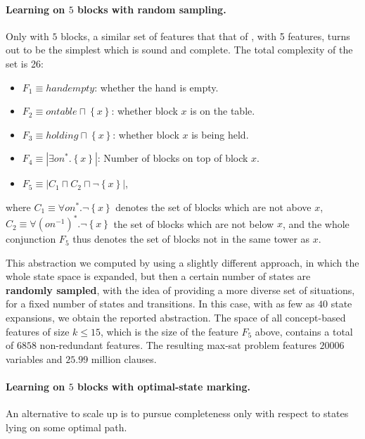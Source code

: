 \documentclass[12pt]{article}
\newcommand{\set}[1]{\ensuremath{\left\{#1 \right\}}}
\newcommand{\abs}[1]{\ensuremath{\left\vert{#1}\right\vert}}
\begin{document}
\paragraph{Learning on $5$ blocks with random sampling.}

Only with $5$ blocks, a similar set of features that that of \citep{bonet2018features}, with 5 features, turns out to be the simplest
which is sound and complete. The total complexity of the set is 26:


\begin{itemize}
 \item $F_1 \equiv handempty$: whether the hand is empty.
 \item $F_2 \equiv ontable \sqcap \set{x}$: whether block $x$ is on the table.
 \item $F_3 \equiv holding \sqcap \set{x}$: whether block $x$ is being held.
 \item $F_4 \equiv \abs{\exists on^* . \set{x}}$: Number of blocks on top of block $x$.
 \item $F_5 \equiv \abs{C_1 \sqcap C_2 \sqcap \neg \set{x}}$,
\end{itemize}

\noindent where 
$C_1 \equiv \forall on^* . \neg \set{x}$ denotes the set of blocks which are not above $x$,
$C_2 \equiv \forall (on^{-1})^* . \neg \set{x}$ the set of blocks which are not below $x$,
and the whole conjunction $F_5$ thus denotes the set of blocks not in the same tower as $x$.


This abstraction we computed by using a slightly different approach, in which the whole state space is expanded, but then
a certain number of states are \textbf{randomly sampled}, with the idea of providing a more diverse set of situations, for a fixed number
of states and transitions. In this case, with as few as $40$ state expansions, we obtain the reported abstraction.
The space of all concept-based features of size $k \leq 15$, which is the size of the feature $F_5$ above,
contains a total of $6858$ non-redundant features.
The resulting max-sat problem features $20006$ variables and $25.99$ million clauses.

\paragraph{Learning on $5$ blocks with optimal-state marking.}
An alternative to scale up is to pursue completeness only with respect to states lying on some optimal path.
\end{document}
